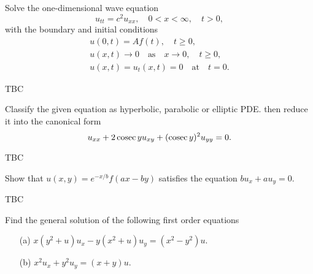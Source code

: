 \documentclass[11pt]{penrose}
\begin{document}
\begin{problem}{5}
    Solve the one-dimensional wave equation
    \begin{equation*}
        u_{tt} = c^2 u_{xx}, \quad 0 < x < \infty, \quad t > 0,
    \end{equation*}
    with the boundary and initial conditions
    \begin{gather*}
        u(0,t) = A f(t), \quad t \geq 0,\\
        u(x,t) \to 0 \quad\text{as}\quad x \to 0, \quad t \geq 0,\\
        u(x,t) = u_t(x,t) = 0 \quad\text{at}\quad t = 0.
    \end{gather*}
    
    \solution TBC
\end{problem}

\begin{problem}{6}
    Classify the given equation as hyperbolic, parabolic or elliptic PDE. then reduce it into the canonical form
    \begin{equation*}
        u_{xx} + 2 \operatorname{cosec} y u_{xy} + (\operatorname{cosec} y)^2 u_{yy} = 0.
    \end{equation*}
    
    \solution TBC
\end{problem}

\begin{problem}{7}
    Show that $u(x,y) = e^{-x/b} f(ax-by)$ satisfies the equation $b u_x + a u_y = 0$.
    
    \solution TBC
\end{problem}

\begin{problem}{8}
    Find the general solution of the following first order equations
    \begin{enumerate}
        \item[(a)] $x (y^2 + u) u_x - y (x^2 + u) u_y = (x^2 - y^2) u$.
        \item[(b)] $x^2 u_x + y^2 u_y = (x + y) u$.
    \end{enumerate}
    
    \solution
\end{problem}
\end{document}
